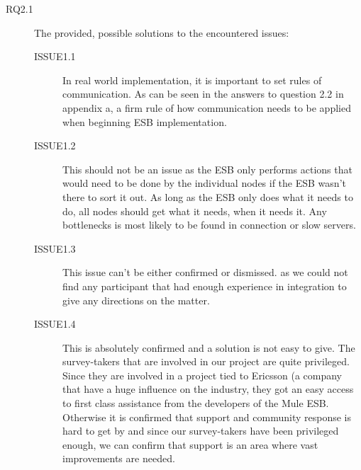 \documentclass{llncs}
\begin{document}
\begin{description}
\item[RQ2.1] The provided, possible solutions to the encountered issues:
\begin{description}

\item[ISSUE1.1] In real world implementation, it is important to set rules of communication. As can be seen in the answers to question 2.2 in appendix a, a firm rule of how communication needs to be applied when beginning ESB implementation. 
\item[ISSUE1.2] This should not be an issue as the ESB only performs actions that would need to be done by the individual nodes if the ESB wasn’t there to sort it out. As long as the ESB only does what it needs to do, all nodes should get what it needs, when it needs it. Any bottlenecks is most likely to be found in connection or slow servers.
\item[ISSUE1.3] This issue can’t be either confirmed or dismissed. as we could not find any participant that had enough experience in integration to give any directions on the matter.
\item[ISSUE1.4] This is absolutely confirmed and a solution is not easy to give. The survey-takers that are involved in our project are quite privileged. Since they are involved in a project tied to Ericsson (a company that have a huge influence on the industry, they got an easy access to first class assistance from the developers of the Mule ESB. Otherwise it is confirmed that support and community response is hard to get by and since our survey-takers have been privileged enough, we can confirm that support is an area where vast improvements are needed. 
\end{description}


\end{description}
\end{document}
